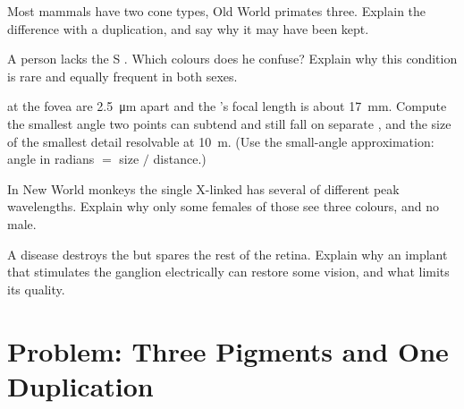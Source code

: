 \begin{exercise}[$\star\star$]\label{exo:g11:the-eye:11}
Most mammals have two cone types, Old World primates three. Explain
the difference with a duplication, and say why it may have been kept.
\end{exercise}

\begin{exercise}[$\star\star\star$]\label{exo:g11:the-eye:12}
A person lacks the S . Which colours does he confuse? Explain
why this condition is rare and equally frequent in both sexes.
\end{exercise}

\begin{exercise}[$\star\star\star$]\label{exo:g11:the-eye:13}
 at the fovea are \qty{2.5}{\micro m} apart and the 's focal
length is about \qty{17}{mm}. Compute the smallest angle two points
can subtend and still fall on separate , and the size of the
smallest detail resolvable at \qty{10}{m}. (Use the small-angle
approximation: angle in radians $=$ size $/$ distance.)
\end{exercise}

\begin{exercise}[$\star\star\star$]\label{exo:g11:the-eye:14}
In New World monkeys the single X-linked   has several
 of different peak wavelengths. Explain why only some females
of those  see three colours, and no male.
\end{exercise}

\begin{exercise}[$\star\star\star$]\label{exo:g11:the-eye:15}
A disease destroys the  but spares the rest of the
retina. Explain why an implant that stimulates the ganglion 
electrically can restore some vision, and what limits its quality.
\end{exercise}

\section{Problem: Three Pigments and One Duplication}

